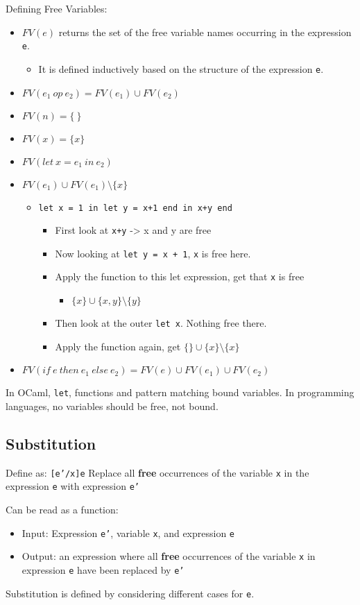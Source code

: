 \documentclass[11pt]{article}
\begin{document}
Defining Free Variables:
\begin{itemize}
\item \(FV(e)\) returns the set of the free variable names occurring in the expression \texttt{e}.
\begin{itemize}
\item It is defined inductively based on the structure of the expression \texttt{e}.
\end{itemize}
\item \(FV(e_1 \ op \ e_2) = FV(e_1) \cup FV(e_2)\)
\item \(FV(n) = \{ \ \}\)
\item \(FV(x) = \{x\}\)
\item \(FV(let \ x = e_1 \ in \ e_2)\)
\item \(FV(e_1) \cup FV(e_1) \setminus \{x\}\)
\begin{itemize}
\item \texttt{let x = 1 in let y = x+1 end in x+y end}
\begin{itemize}
\item First look at \texttt{x+y} -> x and y are free
\item Now looking at \texttt{let y = x + 1}, \texttt{x} is free here.
\item Apply the function to this let expression, get that \texttt{x} is free
\begin{itemize}
\item \(\{x\} \cup \{x,y\}\setminus \{y\}\)
\end{itemize}
\item Then look at the outer \texttt{let x}. Nothing free there.
\item Apply the function again, get \(\{\} \cup \{x\} \setminus \{x\}\)
\end{itemize}
\end{itemize}
\item \(FV(if \ e \ then \ e_1 \ else \ e_2) = FV(e) \cup FV(e_1) \cup FV(e_2)\)
\end{itemize}
In OCaml, \texttt{let}, functions and pattern matching bound variables. In programming languages, no variables should be free, not bound.
\subsection{Substitution}
\label{sec:org1ca3c0e}
Define as: \texttt{[e'/x]e} Replace all \textbf{free} occurrences of the variable \texttt{x} in the expression \texttt{e} with expression \texttt{e'}

Can be read as a function:
\begin{itemize}
\item Input: Expression \texttt{e'}, variable \texttt{x}, and expression \texttt{e}
\item Output: an expression where all \textbf{free} occurrences of the variable \texttt{x} in expression \texttt{e} have been replaced by \texttt{e'}
\end{itemize}
Substitution is defined by considering different cases for \texttt{e}.
\end{document}
